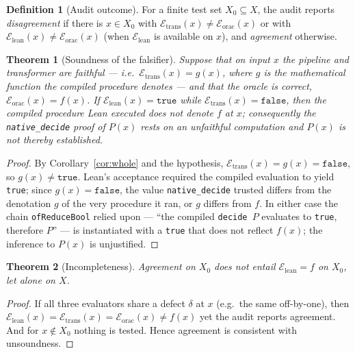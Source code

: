 \documentclass[11pt]{article}
\theoremstyle{definition}
\newtheorem{definition}{Definition}
\theoremstyle{plain}
\newtheorem{theorem}{Theorem}
\theoremstyle{remark}
\newcommand{\eval}{\mathcal{E}}
\begin{document}
\begin{definition}[Audit outcome]
For a finite test set $X_0\subseteq X$, the audit reports \emph{disagreement} if there is $x\in X_0$
with $\eval_{\mathrm{trans}}(x)\neq \eval_{\mathrm{orac}}(x)$ or with
$\eval_{\mathrm{lean}}(x)\neq\eval_{\mathrm{orac}}(x)$ (when $\eval_{\mathrm{lean}}$ is available on
$x$), and \emph{agreement} otherwise.
\end{definition}

\begin{theorem}[Soundness of the falsifier]\label{thm:sound}
Suppose that on input $x$ the pipeline and transformer are faithful --- i.e.\
$\eval_{\mathrm{trans}}(x) = g(x)$, where $g$ is the mathematical function the compiled procedure
\emph{denotes} --- and that the oracle is correct, $\eval_{\mathrm{orac}}(x)=f(x)$. If
$\eval_{\mathrm{lean}}(x)=\texttt{true}$ while $\eval_{\mathrm{trans}}(x)=\texttt{false}$, then the
compiled procedure Lean executed does not denote $f$ at $x$; consequently the \texttt{native\_decide}
proof of $P(x)$ rests on an unfaithful computation and $P(x)$ is not thereby established.
\end{theorem}
\begin{proof}
By Corollary~\ref{cor:whole} and the hypothesis, $\eval_{\mathrm{trans}}(x)=g(x)=\texttt{false}$, so
$g(x)\neq\texttt{true}$. Lean's acceptance required the compiled evaluation to yield \texttt{true};
since $g(x)=\texttt{false}$, the value \texttt{native\_decide} trusted differs from the denotation $g$
of the very procedure it ran, or $g$ differs from $f$. In either case the chain
\texttt{ofReduceBool} relied upon --- ``the compiled \texttt{decide }$P$ evaluates to \texttt{true},
therefore $P$'' --- is instantiated with a \texttt{true} that does not reflect $f(x)$; the inference to
$P(x)$ is unjustified.
\end{proof}

\begin{theorem}[Incompleteness]\label{thm:incomplete}
Agreement on $X_0$ does not entail $\eval_{\mathrm{lean}}=f$ on $X_0$, let alone on $X$.
\end{theorem}
\begin{proof}
If all three evaluators share a defect $\delta$ at $x$ (e.g.\ the same off-by-one), then
$\eval_{\mathrm{lean}}(x)=\eval_{\mathrm{trans}}(x)=\eval_{\mathrm{orac}}(x)\neq f(x)$ yet the audit
reports agreement. And for $x\notin X_0$ nothing is tested. Hence agreement is consistent with
unsoundness.
\end{proof}
\end{document}
